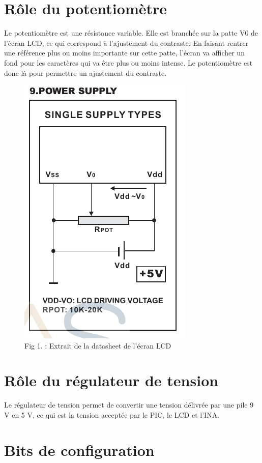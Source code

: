 \documentclass[a4paper,11pt,titlepage]{article}
\begin{document}
\section{Rôle du potentiomètre}
Le potentiomètre est une résistance variable. Elle est branchée sur la patte V0 de l'écran LCD, ce qui correspond à l'ajustement du contraste. En faisant rentrer une référence plus ou moins importante sur cette patte, l'écran va afficher un fond pour les caractères qui va être plus ou moins intense. Le potentiomètre est donc là pour permettre un ajustement du contraste.
\begin{figure}
  \begin{center}
    \includegraphics{./img/LCD_Supply.png}
    \caption{Fig 1. : Extrait de la datasheet de l'écran LCD}
    \label{fig:}
  \end{center}
\end{figure}

\section{Rôle du régulateur de tension}
Le régulateur de tension permet de convertir une tension délivrée par une pile 9 V en 5 V, ce qui est la tension acceptée par le PIC, le LCD et l'INA.


\section{Bits de configuration}
\end{document}
